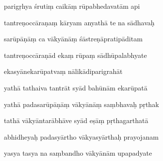 \documentclass[article,12pt,a4paper]{memoir}%
\newcounter{parCount}
\begin{document}
	  
	  \pstart {} parigṛhya śrutiṃ caikāṃ rūpabhedavatām api 
	{}
	\pend%
      

	  
	  \pstart \leavevmode%
	tantreṇoccāraṇaṃ kāryam anyathā te na sādhavaḥ 
	{}
	\pend%
      

	  
	  \pstart {} sarūpāṇāṃ ca vākyānāṃ śāstreṇāpratipāditam 
	{}
	\pend%
      

	  
	  \pstart \leavevmode%
	tantreṇoccāraṇād ekaṃ rūpaṃ sādhūpalabhyate 
	{}
	\pend%
      

	  
	  \pstart {} ekasyānekarūpatvaṃ nālikādiparigrahāt 
	{}
	\pend%
      

	  
	  \pstart \leavevmode%
	yathā tathaiva tantrāt syād bahūnām ekarūpatā 
	{}
	\pend%
      

	  
	  \pstart {} yathā padasarūpāṇāṃ vākyānāṃ saṃbhavaḥ pṛthak 
	{}
	\pend%
      

	  
	  \pstart \leavevmode%
	tathā vākyāntarābhāve syād eṣāṃ pṛthagarthatā 
	{}
	\pend%
      

	  
	  \pstart {} abhidheyaḥ padasyārtho vākyasyārthaḥ prayojanam 
	{}
	\pend%
      

	  
	  \pstart \leavevmode%
	yasya tasya na saṃbandho vākyānām upapadyate 
	{}
	\pend%
      
\end{document}
